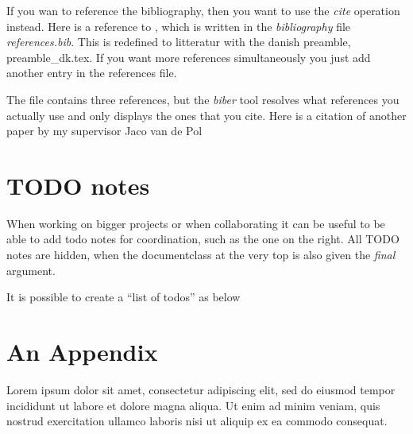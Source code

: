 \documentclass[a4, english]{article}
\begin{document}
If you wan to reference the bibliography, then you want to use the \emph{cite}
operation instead. Here is a reference to \cite{ICALP:Hansen2020}, which is
written in the \emph{bibliography} file \emph{references.bib}. This is redefined
to litteratur with the danish preamble, preamble\_dk.tex. If you want more
references simultaneously you just add another entry in the references file.

The file contains three references, but the \emph{biber} tool resolves what
references you actually use and only displays the ones that you cite. Here is a
citation of another paper by my supervisor Jaco van de
Pol~\cite{STTT:bloemen2019}

\section{TODO notes}
When working on bigger projects or when collaborating it can be useful to be
able to add todo notes for coordination, such as the one on the right. All TODO
notes are hidden, when the documentclass at the very top is also given the
\emph{final} argument.


It is possible to create a ``list of todos'' as below

\printbibliography

\newpage \appendix
\section{An Appendix}
Lorem ipsum dolor sit amet, consectetur adipiscing elit, sed do eiusmod tempor
incididunt ut labore et dolore magna aliqua. Ut enim ad minim veniam, quis
nostrud exercitation ullamco laboris nisi ut aliquip ex ea commodo consequat.
\end{document}

